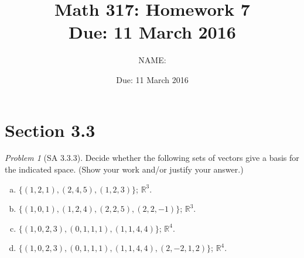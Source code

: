 \documentclass[fleqn,11pt]{paper}
\author         {NAME:                     }
\title{Math 317: Homework 7 \\{\large Due: 11 March 2016}}
\date{Due: 11 March 2016}
\theoremstyle{remark}
\newtheorem{problem}{Problem}
\newtheorem*{solution}{{\bf Solution}}
\newcommand\R{\ensuremath{\mathbb{R}}}
\begin{document}
\maketitle

\section*{Section 3.3}
\begin{problem}[SA 3.3.3]
Decide whether the following sets of vectors give a basis for the indicated
space. (Show your work and/or justify your answer.)
\begin{enumerate}[a.]
\item $\{(1, 2, 1), (2, 4, 5), (1, 2, 3)\}$; $\R^3$.
\item $\{(1, 0, 1), (1, 2, 4), (2, 2, 5), (2, 2, -1)\}$; $\R^3$.
\item $\{(1, 0, 2, 3), (0, 1, 1, 1), (1, 1, 4, 4)\}$; $\R^4$.
\item $\{(1, 0, 2, 3), (0, 1, 1, 1), (1, 1, 4, 4), (2, -2, 1, 2)\}$; $\R^4$.
\end{enumerate}
\end{problem}

\newpage
\end{document}
